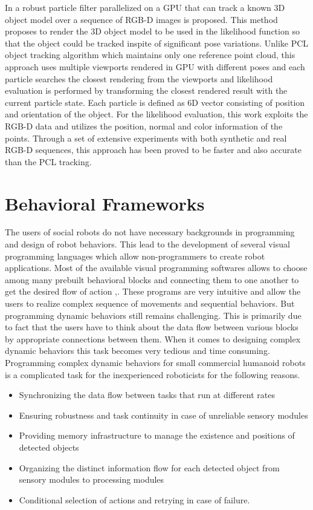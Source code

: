 {	In \cite{choi2013rgb} a robust particle filter parallelized on a GPU that can track a known 3D object model over a sequence of RGB-D images is proposed. This method proposes to render the 3D object model to be used in the likelihood function so that the object could be tracked inspite of significant pose variations. Unlike PCL object tracking algorithm\cite{rusu20113d} which maintains only one reference point cloud, this approach uses multiple viewports rendered in GPU with different poses and each particle searches the closest rendering from the viewports and likelihood evaluation is performed by transforming the closest rendered result with the current particle state. Each particle is defined as 6D vector consisting of position and orientation of the object. For the likelihood evaluation, this work exploits the RGB-D data and utilizes the position, normal and color information of the points. Through a set of extensive experiments with both synthetic and real RGB-D sequences, this approach has been proved to be faster and also accurate than the PCL tracking.
	
\section{Behavioral Frameworks} %
The users of social robots do not have necessary backgrounds in programming and design of robot behaviors. This lead to the development of several visual programming languages which allow non-programmers to create robot applications. Most of the available visual programming softwares allows to choose among many prebuilt behavioral blocks and connecting them to one another to get the desired flow of action \cite{MSRS4},\cite{Choregraphe}. These programs are very intuitive and allow the users to realize complex sequence of movements and sequential behaviors. But programming dynamic behaviors still remains challenging. This is primarily due to fact that the users have to think about the data flow between various blocks by appropriate connections between them. When it comes to designing complex dynamic behaviors this task becomes very tedious and time consuming. 
Programming complex dynamic behaviors for small commercial humanoid robots is a complicated task for the inexperienced roboticists\cite{berenz2014targets} for the following reasons.
\begin{itemize}
\item Synchronizing the data flow between tasks that run at different rates
\item Ensuring robustness and task continuity in case of unreliable sensory modules
\item Providing memory infrastructure to manage the existence and positions of detected objects
\item Organizing the distinct information flow for each detected object from sensory modules to processing modules
\item Conditional selection of actions and retrying in case of failure. 
\end{itemize}
}
